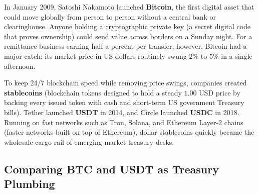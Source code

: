 \begin{historybox}
In January 2009, Satoshi Nakamoto launched \textbf{Bitcoin}, the first digital asset that could move globally from person to person without a central bank or clearinghouse. Anyone holding a cryptographic private key (a secret digital code that proves ownership) could send value across borders on a Sunday night. For a remittance business earning half a percent per transfer, however, Bitcoin had a major catch: its market price in US dollars routinely swung $2\%$ to $5\%$ in a single afternoon.

To keep 24/7 blockchain speed while removing price swings, companies created \textbf{stablecoins} (blockchain tokens designed to hold a steady $1.00\text{ USD}$ price by backing every issued token with cash and short-term US government Treasury bills). Tether launched \textbf{USDT} in 2014, and Circle launched \textbf{USDC} in 2018. Running on fast networks such as Tron, Solana, and Ethereum Layer-2 chains (faster networks built on top of Ethereum), dollar stablecoins quickly became the wholesale cargo rail of emerging-market treasury desks.
\end{historybox}

\subsection{Comparing BTC and USDT as Treasury Plumbing}

